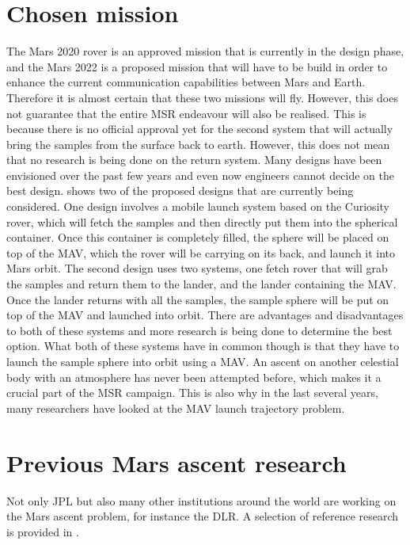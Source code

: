 \section{Chosen mission}
\label{sec:chosenMission}
The Mars 2020 rover is an approved mission that is currently in the design phase, and the Mars 2022 is a proposed mission that will have to be build in order to enhance the current communication capabilities between Mars and Earth. Therefore it is almost certain that these two missions will fly. However, this does not guarantee that the entire \ac{MSR} endeavour will also be realised. This is because there is no official approval yet for the second system that will actually bring the samples from the surface back to earth. However, this does not mean that no research is being done on the return system. Many designs have been envisioned over the past few years and even now engineers cannot decide on the best design. \cite{shotwell2016drivers} shows two of the proposed designs that are currently being considered. One design involves a mobile launch system based on the Curiosity rover, which will fetch the samples and then directly put them into the spherical container. Once this container is completely filled, the sphere will be placed on top of the \ac{MAV}, which the rover will be carrying on its back, and launch it into Mars orbit. The second design uses two systems, one fetch rover that will grab the samples and return them to the lander, and the lander containing the \ac{MAV}. Once the lander returns with all the samples, the sample sphere will be put on top of the \ac{MAV} and launched into orbit. There are advantages and disadvantages to both of these systems and more research is being done to determine the best option. What both of these systems have in common though is that they have to launch the sample sphere into orbit using a \ac{MAV}. An ascent on another celestial body with an atmosphere has never been attempted before, which makes it a crucial part of the \ac{MSR} campaign. This is also why in the last several years, many researchers have looked at the \ac{MAV} launch trajectory problem. 


\section{Previous Mars ascent research}
\label{sec:previousMarsAscentResearch}
Not only \ac{JPL} but also many other institutions around the world are working on the Mars ascent problem, for instance the \ac{DLR}. A selection of reference research is provided in .

